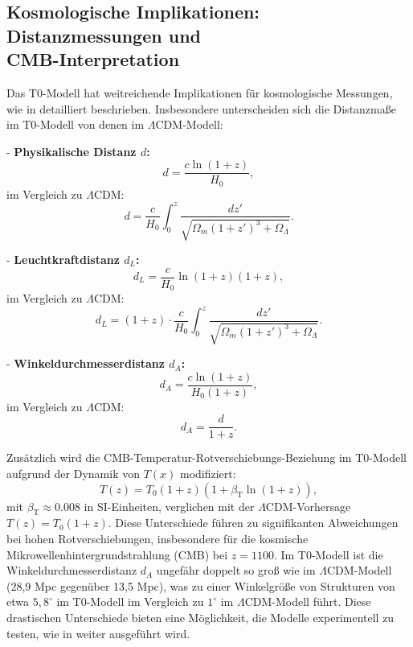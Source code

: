 \documentclass[12pt,a4paper]{article}
\newcommand{\Tfield}{T(x)}
\newcommand{\betaT}{\beta_{\text{T}}}
\begin{document}
	\subsection{Kosmologische Implikationen: Distanzmessungen und \\CMB-Interpretation}
	Das T0-Modell hat weitreichende Implikationen für kosmologische Messungen, wie in \cite{pascher_messdifferenzen_2025} detailliert beschrieben. Insbesondere unterscheiden sich die Distanzmaße im T0-Modell von denen im \(\Lambda\)CDM-Modell:
	
	- \textbf{Physikalische Distanz \( d \):}
	\[
	d = \frac{c \ln(1 + z)}{H_0},
	\]
	im Vergleich zu \(\Lambda\)CDM:
	\[
	d = \frac{c}{H_0} \int_0^z \frac{dz'}{\sqrt{\Omega_m (1 + z')^3 + \Omega_\Lambda}}.
	\]
	
	- \textbf{Leuchtkraftdistanz \( d_L \):}
	\[
	d_L = \frac{c}{H_0} \ln(1 + z) (1 + z),
	\]
	im Vergleich zu \(\Lambda\)CDM:
	\[
	d_L = (1 + z) \cdot \frac{c}{H_0} \int_0^z \frac{dz'}{\sqrt{\Omega_m (1 + z')^3 + \Omega_\Lambda}}.
	\]
	
	- \textbf{Winkeldurchmesserdistanz \( d_A \):}
	\[
	d_A = \frac{c \ln(1 + z)}{H_0 (1 + z)},
	\]
	im Vergleich zu \(\Lambda\)CDM:
	\[
	d_A = \frac{d}{1 + z}.
	\]
	
	Zusätzlich wird die CMB-Temperatur-Rotverschiebungs-Beziehung im T0-Modell aufgrund der Dynamik von \( \Tfield \) modifiziert:
	\begin{equation}
		T(z) = T_0 (1 + z) (1 + \betaT \ln(1 + z)),
	\end{equation}
	mit \( \betaT \approx 0.008 \) in SI-Einheiten, verglichen mit der \(\Lambda\)CDM-Vorhersage \( T(z) = T_0 (1 + z) \). Diese Unterschiede führen zu signifikanten Abweichungen bei hohen Rotverschiebungen, insbesondere für die kosmische Mikrowellenhintergrundstrahlung (CMB) bei \( z = 1100 \). Im T0-Modell ist die Winkeldurchmesserdistanz \( d_A \) ungefähr doppelt so groß wie im \(\Lambda\)CDM-Modell (28,9 Mpc gegenüber 13,5 Mpc), was zu einer Winkelgröße von Strukturen von etwa \( 5,8^\circ \) im T0-Modell im Vergleich zu \( 1^\circ \) im \(\Lambda\)CDM-Modell führt. Diese drastischen Unterschiede bieten eine Möglichkeit, die Modelle experimentell zu testen, wie in \cite{pascher_messdifferenzen_2025} weiter ausgeführt wird.
	
\end{document}
